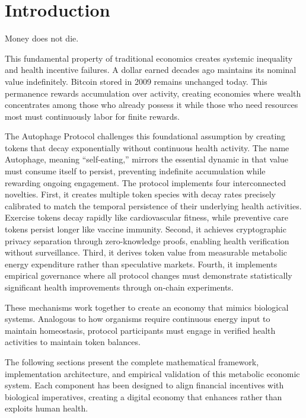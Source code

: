 \documentclass[11pt,letterpaper]{article}
\begin{document}
\clearpage
\tableofcontents
\clearpage

\section{Introduction}

Money does not die.

This fundamental property of traditional economics creates systemic inequality and health incentive failures. A dollar earned decades ago maintains its nominal value indefinitely. Bitcoin \cite{nakamoto2008bitcoin} stored in 2009 remains unchanged today. This permanence rewards accumulation over activity, creating economies where wealth concentrates among those who already possess it while those who need resources most must continuously labor for finite rewards.

The Autophage Protocol challenges this foundational assumption by creating tokens that decay exponentially without continuous health activity. The name Autophage, meaning ``self-eating,'' mirrors the essential dynamic in that value must consume itself to persist, preventing indefinite accumulation while rewarding ongoing engagement. The protocol implements four interconnected novelties. First, it creates multiple token species with decay rates precisely calibrated to match the temporal persistence of their underlying health activities. Exercise tokens decay rapidly like cardiovascular fitness, while preventive care tokens persist longer like vaccine immunity. Second, it achieves cryptographic privacy separation through zero-knowledge proofs, enabling health verification without surveillance. Third, it derives token value from measurable metabolic energy expenditure rather than speculative markets. Fourth, it implements empirical governance where all protocol changes must demonstrate statistically significant health improvements through on-chain experiments.

These mechanisms work together to create an economy that mimics biological systems. Analogous to how organisms require continuous energy input to maintain homeostasis, protocol participants must engage in verified health activities to maintain token balances.

The following sections present the complete mathematical framework, implementation architecture, and empirical validation of this metabolic economic system. Each component has been designed to align financial incentives with biological imperatives, creating a digital economy that enhances rather than exploits human health.
\end{document}

